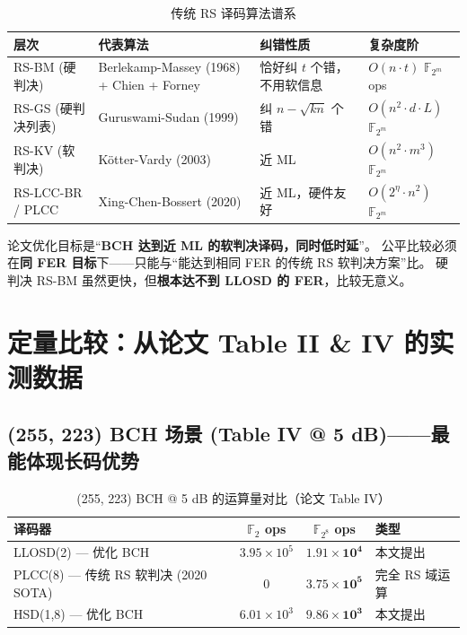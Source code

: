 \documentclass[11pt,a4paper]{article}
\begin{document}
\begin{table}[h!]
\centering
\begin{tabularx}{\textwidth}{lXll}
\toprule
\textbf{层次} & \textbf{代表算法} & \textbf{纠错性质} & \textbf{复杂度阶} \\
\midrule
RS-BM (硬判决) & Berlekamp-Massey (1968) + Chien + Forney &
恰好纠 $t$ 个错，不用软信息 & $O(n\cdot t)$ $\mathbb{F}_{2^m}$ ops \\
RS-GS (硬判决列表) & Guruswami-Sudan (1999) &
纠 $n - \sqrt{kn}$ 个错 & $O(n^2\cdot d\cdot L)$ $\mathbb{F}_{2^m}$ \\
RS-KV (软判决) & K\"otter-Vardy (2003) &
近 ML & $O(n^2\cdot m^3)$ $\mathbb{F}_{2^m}$ \\
RS-LCC-BR / PLCC & Xing-Chen-Bossert (2020) &
近 ML，硬件友好 & $O(2^{\eta}\cdot n^2)$ $\mathbb{F}_{2^m}$ \\
\bottomrule
\end{tabularx}
\caption{传统 RS 译码算法谱系}
\end{table}

\begin{keybox}[title=\textbf{关键澄清}]
论文优化目标是``\textbf{BCH 达到近 ML 的软判决译码，同时低时延}''。
公平比较必须在\textbf{同 FER 目标}下——只能与``能达到相同 FER 的传统 RS 软判决方案''比。
硬判决 RS-BM 虽然更快，但\textbf{根本达不到 LLOSD 的 FER}，比较无意义。
\end{keybox}

\section{定量比较：从论文 Table II \& IV 的实测数据}

\subsection{(255, 223) BCH 场景 (Table IV @ 5 dB)——最能体现长码优势}

\begin{table}[h!]
\centering
\begin{tabular}{lccl}
\toprule
\textbf{译码器} & \textbf{$\mathbb{F}_2$ ops} & \textbf{$\mathbb{F}_{2^8}$ ops} & \textbf{类型} \\
\midrule
LLOSD(2) — 优化 BCH & $3.95\times 10^5$ & $\bm{1.91\times 10^4}$ & 本文提出 \\
PLCC(8) — 传统 RS 软判决 (2020 SOTA) & $0$ & $\bm{3.75\times 10^5}$ & 完全 RS 域运算 \\
HSD(1,8) — 优化 BCH & $6.01\times 10^3$ & $\bm{9.86\times 10^3}$ & 本文提出 \\
\bottomrule
\end{tabular}
\caption{(255, 223) BCH @ 5 dB 的运算量对比（论文 Table IV）}
\end{table}
\end{document}
